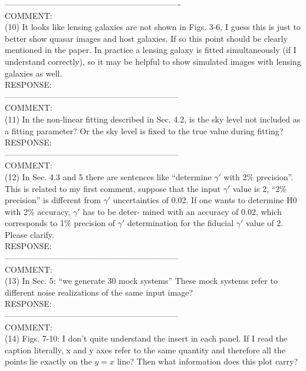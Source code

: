 \documentclass[a4paper,11pt]{article}
\begin{document}
----------------------------------------------------------------
\\
COMMENT:
\\
(10) It looks like lensing galaxies are not shown in Figs. 3-6, I guess this is just to better show quasar images and host galaxies. If so this point should be clearly mentioned in the paper. In practice a lensing galaxy is fitted simultaneously (if I understand correctly), so it may be helpful to show simulated images with lensing galaxies as well.
\\

RESPONSE:
\\


---------------------------------------------------------------
\\
COMMENT:
\\
(11) In the non-linear fitting described in Sec. 4.2, is the sky level not included as a fitting parameter? Or the sky level is fixed to the true value during fitting?
\\

RESPONSE:
\\

---------------------------------------------------------------
\\
COMMENT:
\\
(12) In Sec. 4.3 and 5 there are sentences like “determine $\gamma'$ with 2\% precision”. This is related to my first comment, suppose that the input $\gamma'$ value is 2, “2\% precision” is different from $\gamma'$ uncertainties of 0.02. If one wants to determine H0 with 2\% accuracy, $\gamma'$ has to be deter- mined with an accuracy of 0.02, which corresponds to 1\% precision of $\gamma'$ determination for the fiducial $\gamma'$ value of 2. Please clarify.
\\

RESPONSE:
\\

---------------------------------------------------------------
\\
COMMENT:
\\
(13) In Sec. 5: “we generate 30 mock systems” These mock systems refer to different noise realizations of the same input image?
\\

RESPONSE:
\\

---------------------------------------------------------------
\\
COMMENT:
\\
(14) Figs. 7-10: I don’t quite understand the insert in each panel. If I read the caption literally, x and y axes refer to the same quantity and therefore all the points lie exactly on the $y = x$ line? Then what information does this plot carry?
\\
\end{document}
